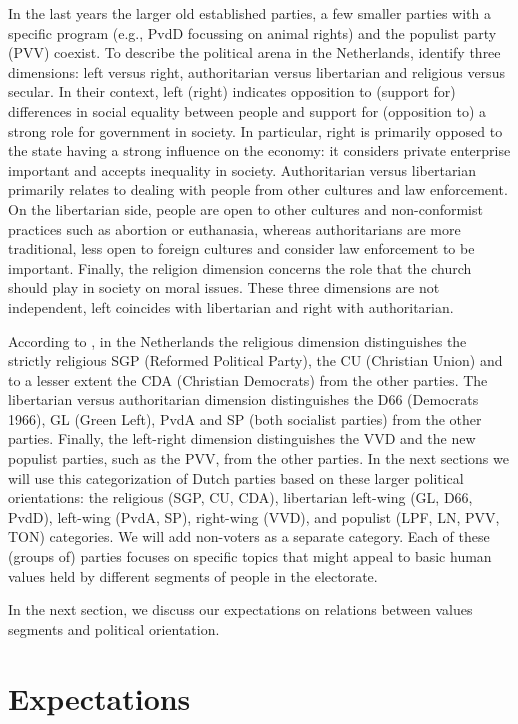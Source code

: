 \documentclass[12pt,letter]{article}\usepackage[]{graphicx}\usepackage[]{xcolor}
\begin{document}
In the last years the larger old established parties, a few smaller parties with a specific program (e.g., PvdD focussing on animal rights) and the populist party (PVV) coexist. To describe the political arena in the Netherlands, \citet{aarts2008} identify three dimensions: left versus right, authoritarian versus libertarian and religious versus secular. In their context, left (right) indicates opposition to (support for) differences in social equality between people and support for (opposition to) a strong role for government in society. In particular, right is primarily opposed to the state having a strong influence on the economy: it considers private enterprise important and accepts inequality in society. Authoritarian versus libertarian primarily relates to dealing with people from other cultures and law enforcement. On the libertarian side, people are open to other cultures and non-conformist practices such as abortion or euthanasia, whereas authoritarians are more traditional, less open to foreign cultures and consider law enforcement to be important. Finally, the religion dimension concerns the role that the church should play in society on moral issues. These three dimensions are not independent, left coincides with libertarian and right with authoritarian. 

According to  \citet{aarts2008}, in the Netherlands the religious dimension distinguishes the strictly religious SGP (Reformed Political Party), the CU (Christian Union) and to a lesser extent the CDA (Christian Democrats) from the other parties. The libertarian versus authoritarian dimension distinguishes the D66 (Democrats 1966), GL (Green Left), PvdA and SP (both socialist parties) from the other parties. Finally, the left-right dimension distinguishes the VVD and the new populist parties, such as the PVV, from the other parties. In the next sections we will use this categorization of Dutch parties based on these larger political orientations: the religious (SGP, CU, CDA), libertarian left-wing (GL, D66, PvdD), left-wing (PvdA, SP), right-wing (VVD), and populist (LPF, LN, PVV, TON) categories. We will add non-voters as a separate category. Each of these (groups of) parties focuses on specific topics that might appeal to basic human values held by different segments of people in the electorate. 

In the next section, we discuss our expectations on relations between values segments and political orientation.

\section*{Expectations}
\end{document}
